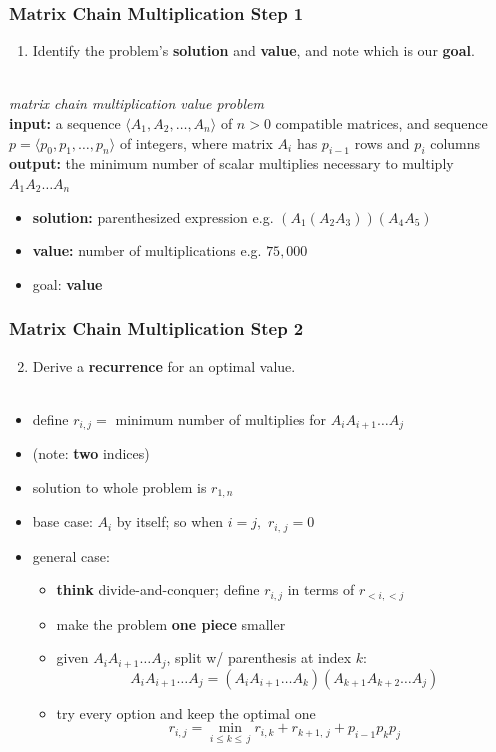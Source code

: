 \documentclass[10pt,aspectratio=169]{beamer}
\newcommand{\stanza}{ \\~\ }
\begin{document}
\begin{frame} \frametitle{Matrix Chain Multiplication Step 1}
\begin{enumerate}
  \item Identify the problem's \textbf{solution} and \textbf{value}, and note which is our \textbf{goal}.
  \stanza
\end{enumerate}
\emph{matrix chain multiplication value problem} \\
\textbf{input:} a sequence $\langle A_1, A_2, \ldots, A_n \rangle$ of $n>0$ compatible matrices,
  and sequence $p=\langle p_0, p_1, \ldots, p_n \rangle$ of integers, where
  matrix $A_i$ has $p_{i-1}$ rows and $p_i$ columns \\
\textbf{output:} the minimum number of scalar multiplies necessary to multiply $A_1 A_2 \ldots A_n$ 
\begin{itemize}
  \item \textbf{solution:} parenthesized expression e.g. $(A_1(A_2 A_3))(A_4 A_5)$
  \item \textbf{value:} number of multiplications e.g. $75,000$
  \item goal: \textbf{value}
\end{itemize}
\end{frame}

\begin{frame} \frametitle{Matrix Chain Multiplication Step 2}
  \begin{enumerate}
    \setcounter{enumi}{1}
    \item Derive a \textbf{recurrence} for an optimal value.
    \stanza
  \end{enumerate}

  \begin{itemize}
    \item define $r_{i, j} = $ minimum number of multiplies for $A_i A_{i+1} \ldots A_j$
    \item (note: \textbf{two} indices)
    \item solution to whole problem is $r_{1, n}$
    \item base case: $A_i$ by itself; so when $i=j,$ $r_{i,\, j} = 0$
    \item general case:
    \begin{itemize}
      \item \textbf{think} divide-and-conquer; define $r_{i, j}$ in terms of $r_{<i, <j}$
      \item make the problem \textbf{one piece} smaller
      \item given $A_i A_{i+1} \ldots A_j$, split w/ parenthesis at index $k:$
        \[ A_i A_{i+1} \ldots A_j = (A_i A_{i+1} \ldots A_k) (A_{k+1} A_{k+2} \ldots A_j) \]
      \item try every option and keep the optimal one
      \[ r_{i, j} = \min_{i \leq k \leq \, j} r_{i, k} + r_{k+1, \, j} + p_{i-1} p_k p_j \]
    \end{itemize}
  \end{itemize}
\end{frame}
  
\end{document}
